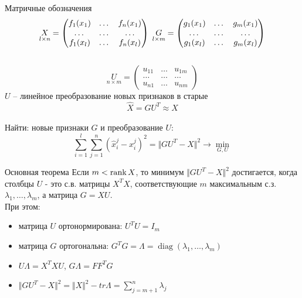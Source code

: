 \documentclass[10pt]{beamer}
\begin{document}
\begin{frame}{Матричные обозначения}
	$$\underset{l \times n}{X} = \begin{pmatrix}
	  f_1(x_1) & \dots & f_n(x_1) \\
	  \dots & \dots & \dots\\
	  f_1(x_l) & \dots & f_n(x_l)
	 \end{pmatrix} \hspace{1mm} 
	 \underset{l \times m}{G} = \begin{pmatrix}
	  g_1(x_1) & \dots & g_m(x_1) \\
	  \dots & \dots & \dots\\
	  g_1(x_l) & \dots & g_m(x_l)
	 \end{pmatrix}$$\\
	 $$\underset{n \times m}{U} = \begin{pmatrix}
	  u_{11} & \dots & u_{1m} \\
	  \dots & \dots & \dots\\
	  u_{n1} & \dots & u_{nm}
	 \end{pmatrix}$$
	$U$ -- линейное преобразование новых признаков в старые\\
	$$\hat{X} = GU^T \approx X$$\\
	\pause
	\alert{Найти:} новые признаки $G$ и преобразование $U$:\\
	$$\sum\limits_{i=1}^l \sum\limits_{j=1}^n (\hat{x}_i^j - x_i^j)^2 = \Vert GU^T - X \Vert^2 \rightarrow \min\limits_{G, U}$$
\end{frame}

\begin{frame}{Основная теорема}
	Если $m < \operatorname{rank} X$, то минимум $\Vert GU^T - X \Vert^2$ достигается, когда столбцы $U$ - это с.в. матрицы $X^TX$, соответствующие $m$ максимальным с.з. $\lambda_1,\dots, \lambda_m$, а матрица $G = XU$.\\
	\bigbreak
	\pause
	При этом:\\
	\begin{itemize}
		\item матрица $U$ ортонормирована: $U^TU = I_m$
		\item матрица $G$ ортогональна: $G^TG = \Lambda = \operatorname{diag}(\lambda_1, \dots, \lambda_m)$
		\item $U\Lambda = X^TXU$,  $G\Lambda = FF^TG$
		\item $\Vert GU^T - X \Vert^2 = \Vert X \Vert^2 - tr \Lambda = \sum\limits_{j=m+1}^n \lambda_j$
	\end{itemize}
\end{frame}
\end{document}
